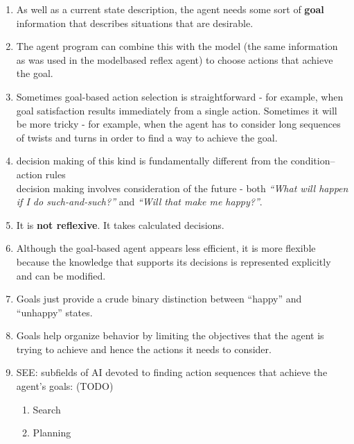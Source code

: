 \begin{enumerate}[itemsep=0.2cm]
    \item As well as a current state description, the agent needs some sort of \textbf{goal} information that describes situations that are desirable.
    \hfill \cite{ai/book/Artificial-Intelligence-A-Modern-Approach/Russell-Norvig}

    \item  The agent program can combine this with the model (the same information as was used in the modelbased reflex agent) to choose actions that achieve the goal.
    \hfill \cite{ai/book/Artificial-Intelligence-A-Modern-Approach/Russell-Norvig}

    \item Sometimes goal-based action selection is straightforward - for example, when goal satisfaction results immediately from a single action. Sometimes it will be more tricky - for example, when the agent has to consider long sequences of twists and turns in order to find a way to achieve the goal.
    \hfill \cite{ai/book/Artificial-Intelligence-A-Modern-Approach/Russell-Norvig}

    \item decision making of this kind is fundamentally different from the condition–action rules \\
    decision making involves consideration of the future - both \textit{“What will happen if I do such-and-such?”} and \textit{“Will that make me happy?”}.
    \hfill \cite{ai/book/Artificial-Intelligence-A-Modern-Approach/Russell-Norvig}

    \item It is \textbf{not reflexive}. It takes calculated decisions.

    \item Although the goal-based agent appears less efficient, it is more flexible because the knowledge that supports its decisions is represented explicitly and can be modified.
    \hfill \cite{ai/book/Artificial-Intelligence-A-Modern-Approach/Russell-Norvig}

    \item Goals just provide a crude binary distinction between “happy” and “unhappy” states.
    \hfill \cite{ai/book/Artificial-Intelligence-A-Modern-Approach/Russell-Norvig}

    \item Goals help organize behavior by limiting the objectives that the agent is trying to achieve and hence the actions it needs  to consider.
    \hfill \cite{ai/book/Artificial-Intelligence-A-Modern-Approach/Russell-Norvig}

    \item SEE: subfields of AI devoted to finding action sequences that achieve the agent’s goals: (TODO)
    \begin{enumerate}
        \item Search
        \item Planning
    \end{enumerate}
\end{enumerate}

